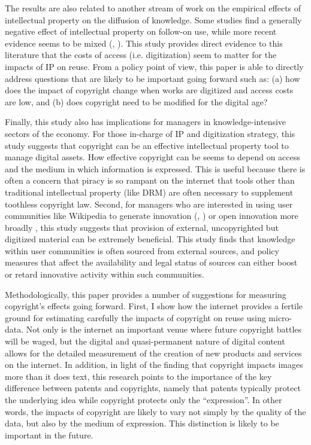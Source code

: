 \documentclass[11pt]{article}
\begin{document}
The results are also related to another stream of work on the empirical effects of intellectual property on the diffusion of knowledge. Some studies \citep{murray_formal_2007, murray_mice_2009, williams_intellectual_2013, furman_climbing_2011} find a generally negative effect of intellectual property on follow-on use, while more recent evidence seems to be mixed (\cite{sampat_how_2014}, \cite{galasso_patents_2015}). This study provides direct evidence to this literature that the costs of access (i.e. digitization) seem to matter for the impacts of IP on reuse. From a policy point of view, this paper is able to directly address questions that are likely to be important going forward such as: (a) how does the impact of copyright change when works are digitized and access costs are low, and (b) does copyright need to be modified for the digital age?



Finally, this study also has implications for managers in knowledge-intensive sectors of the economy. For those in-charge of IP and digitization strategy, this study suggests that copyright can be an effective intellectual property tool to manage digital assets. How effective copyright can be seems to depend on access and the medium in which information is expressed. This is useful because there is often a concern that piracy is so rampant on the internet that tools other than traditional intellectual property (like DRM) are often necessary \citep{zhang_intellectual_2014} to supplement toothless copyright law. Second, for managers who are interested in using user communities like Wikipedia to generate innovation (\cite{boudreau_incentives_2011}, \cite{franzoni_crowd_2014}) or open innovation more broadly \citep{fleming_brokerage_2007}, this study suggests that provision of external, uncopyrighted but digitized material can be extremely beneficial. This study finds that knowledge within user communities is often sourced from external sources, and policy measures that affect the availability and legal status of sources can either boost or retard innovative activity within such communities. 

Methodologically, this paper provides a number of suggestions for measuring copyright's effects going forward. First, I show how the internet provides a fertile ground for estimating carefully the impacts of copyright on reuse using micro-data. Not only is the internet an important venue where future copyright battles will be waged, but the digital and quasi-permanent nature of digital content allows for the detailed measurement of the creation of new products and services on the internet. In addition, in light of the finding that copyright impacts images more than it does text, this research points to the importance of the key difference between patents and copyrights, namely that patents typically protect the underlying idea while copyright protects only the ``expression''. In other words, the impacts of copyright are likely to vary not simply by the quality of the data, but also by the medium of expression. This distinction is likely to be important in the future. 
\end{document}
